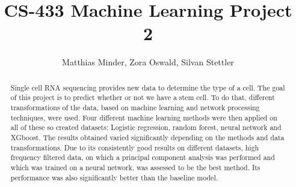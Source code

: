 \documentclass[10pt,conference,compsocconf]{IEEEtran}
\begin{document}
\title{CS-433 Machine Learning Project 2}

\author{
	Matthias Minder, Zora Oswald, Silvan Stettler\\
}

\maketitle

\begin{abstract}
	Single cell RNA sequencing provides new data to determine the type of a cell. The goal of this project is to predict whether or not we have a stem cell. To do that, different transformations of the data, based on machine learning and network processing techniques, were used. Four different machine learning methods were then applied on all of these so created datasets: Logistic regression, random forest, neural network and XGboost. The results obtained varied significantly depending on the methods and data transformations. Due to its consistently good results on different datasets, high frequency filtered data, on which a principal component analysis was performed and which was trained on a neural network, was assessed to be the best method. Its performance was also significantly better than the baseline model.
\end{abstract}
\end{document}
